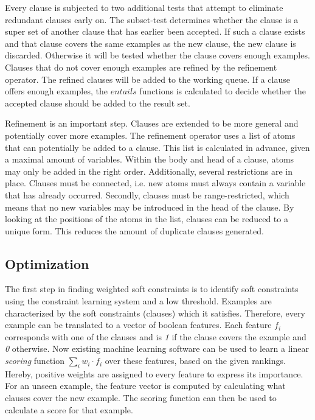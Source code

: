 \documentclass{llncs}
\begin{document}
Every clause is subjected to two additional tests that attempt to eliminate redundant clauses early on.
The subset-test determines whether the clause is a super set of another clause that has earlier been accepted.
If such a clause exists and that clause covers the same examples as the new clause, the new clause is discarded.
Otherwise it will be tested whether the clause covers enough examples.
Clauses that do not cover enough examples are refined by the refinement operator.
The refined clauses will be added to the working queue.
If a clause offers enough examples, the $\mathit{entails}$ functions is calculated to decide whether the accepted clause should be added to the result set.

Refinement is an important step.
Clauses are extended to be more general and potentially cover more examples.
The refinement operator uses a list of atoms that can potentially be added to a clause.
This list is calculated in advance, given a maximal amount of variables.
Within the body and head of a clause, atoms may only be added in the right order.
Additionally, several restrictions are in place.
Clauses must be connected, i.e. new atoms must always contain a variable that has already occurred.
Secondly, clauses must be range-restricted, which means that no new variables may be introduced in the head of the clause.
By looking at the positions of the atoms in the list, clauses can be reduced to a unique form.
This reduces the amount of duplicate clauses generated.

\subsection{Optimization}
The first step in finding weighted soft constraints is to identify soft constraints using the constraint learning system and a low threshold.
Examples are characterized by the soft constraints (clauses) which it satisfies.
Therefore, every example can be translated to a vector of boolean features.
Each feature $f_i$ corresponds with one of the clauses and is \emph{1} if the clause covers the example and \emph{0} otherwise.
Now existing machine learning software can be used to learn a linear \emph{scoring} function $\sum_i w_i \cdot f_i$ over these features, based on the given rankings.
Hereby, positive weights are assigned to every feature to express its importance.
For an unseen example, the feature vector is computed by calculating what clauses cover the new example.
The scoring function can then be used to calculate a score for that example.
\end{document}

